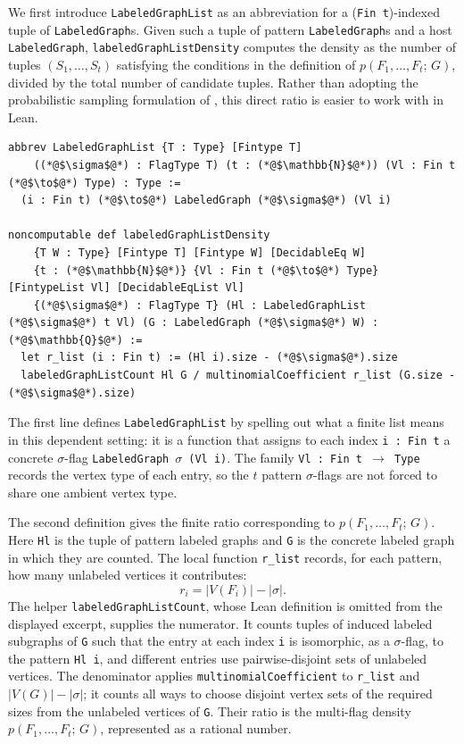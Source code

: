 \documentclass{article}
\newcommand{\den}[2]{p(#1;\,#2)}
\newcommand{\lean}[1]{\texttt{#1}}
\begin{document}
We first introduce \lean{LabeledGraphList} as an abbreviation for a
(\lean{Fin t})-indexed tuple of \lean{LabeledGraph}s.
Given such a tuple of pattern \lean{LabeledGraph}s and a host \lean{LabeledGraph},
\lean{labeledGraphListDensity} computes the density as the number of tuples
$(S_1, \ldots, S_t)$ satisfying the conditions in the definition of $\den{F_1,\ldots,F_t}{G}$,
divided by the total number of candidate tuples.  Rather than adopting the
probabilistic sampling formulation of , this direct ratio is easier to work with in Lean.
\begin{lstlisting}
abbrev LabeledGraphList {T : Type} [Fintype T]
    ((*@$\sigma$@*) : FlagType T) (t : (*@$\mathbb{N}$@*)) (Vl : Fin t (*@$\to$@*) Type) : Type :=
  (i : Fin t) (*@$\to$@*) LabeledGraph (*@$\sigma$@*) (Vl i)

noncomputable def labeledGraphListDensity
    {T W : Type} [Fintype T] [Fintype W] [DecidableEq W]
    {t : (*@$\mathbb{N}$@*)} {Vl : Fin t (*@$\to$@*) Type} [FintypeList Vl] [DecidableEqList Vl]
    {(*@$\sigma$@*) : FlagType T} (Hl : LabeledGraphList (*@$\sigma$@*) t Vl) (G : LabeledGraph (*@$\sigma$@*) W) : (*@$\mathbb{Q}$@*) :=
  let r_list (i : Fin t) := (Hl i).size - (*@$\sigma$@*).size
  labeledGraphListCount Hl G / multinomialCoefficient r_list (G.size - (*@$\sigma$@*).size)
\end{lstlisting}
The first line defines \lean{LabeledGraphList} by spelling out what a finite
list means in this dependent setting: it is a function that assigns to each
index \lean{i : Fin t} a concrete $\sigma$-flag \lean{LabeledGraph}~$\sigma$~\lean{(Vl i)}.
The family \lean{Vl : Fin t $\to$ Type} records the vertex type of each entry, so
the $t$ pattern $\sigma$-flags are not forced to share one ambient vertex type.

The second definition gives the finite ratio corresponding to
$\den{F_1,\ldots,F_t}{G}$.  Here \lean{Hl} is the tuple of pattern labeled
graphs and \lean{G} is the concrete labeled graph in which they are counted.
The local function \lean{r\_list} records, for each pattern, how many unlabeled
vertices it contributes:
\[
  r_i = |V(F_i)| - |\sigma|.
\]
The helper \lean{labeledGraphListCount}, whose Lean definition is omitted from
the displayed excerpt, supplies the numerator.  It counts tuples of induced
labeled subgraphs of \lean{G} such that the entry at each index \lean{i} is
isomorphic, as a $\sigma$-flag, to the pattern \lean{Hl i}, and different
entries use pairwise-disjoint sets of unlabeled vertices.  The denominator
applies \lean{multinomialCoefficient} to \lean{r\_list} and
\(|V(G)| - |\sigma|\); it counts all ways to choose disjoint vertex sets of
the required sizes from the unlabeled vertices of \lean{G}.  Their ratio is
the multi-flag density $\den{F_1,\ldots,F_t}{G}$, represented as a rational
number.
\end{document}
